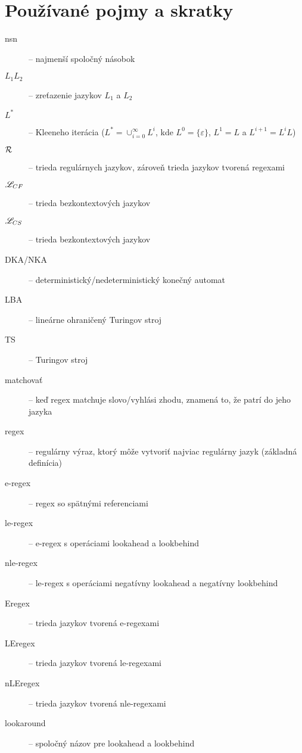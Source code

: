 \chapter*{Používané pojmy a skratky}
\label{chap:pojmy}

\begin{description}
\item[nsn] -- najmenší spoločný násobok
\item[$ L_{1}L_{2} $] -- zreťazenie jazykov $ L_{1} $ a $ L_{2} $
\item[$ L^* $] -- Kleeneho iterácia ($L^*=\cup^{\infty}_{i=0}L^i$, kde $L^0=\lbrace \varepsilon \rbrace$, $L^1=L$ a $L^{i+1}=L^iL$)
\item[$ {\cal R} $] -- trieda regulárnych jazykov, zároveň trieda jazykov tvorená regexami
\item[$ \mathscr{L}_{CF}$] -- trieda bezkontextových jazykov
\item[$ \mathscr{L}_{CS}$] -- trieda bezkontextových jazykov
\item[DKA/NKA] -- deterministický/nedeterministický konečný automat
\item[LBA] -- lineárne ohraničený Turingov stroj
\item[TS] -- Turingov stroj
\item[matchovať] -- keď regex matchuje slovo/vyhlási zhodu, znamená to, že patrí do jeho jazyka
\item[regex] -- regulárny výraz, ktorý môže vytvoriť najviac regulárny jazyk (základná definícia)
\item[e-regex] -- regex so spätnými referenciami
\item[le-regex] -- e-regex s operáciami lookahead a lookbehind
\item[nle-regex] -- le-regex s operáciami negatívny lookahead a negatívny lookbehind
\item[Eregex] -- trieda jazykov tvorená e-regexami
\item[LEregex] -- trieda jazykov tvorená le-regexami
\item[nLEregex] -- trieda jazykov tvorená nle-regexami
\item[lookaround] -- spoločný názov pre lookahead a lookbehind
\end{description}

